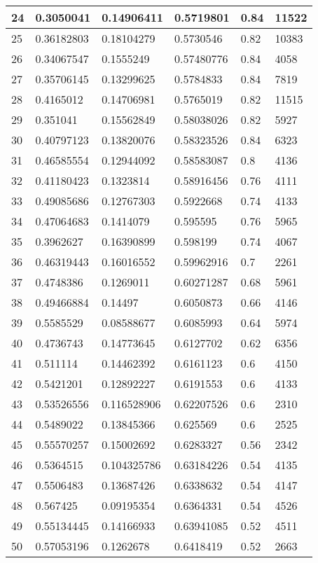 \begin{longtable}{|l|l|l|l|l|l|}
24 & 0.3050041 & 0.14906411 & 0.5719801 & 0.84 & 11522 \\ \hline 
25 & 0.36182803 & 0.18104279 & 0.5730546 & 0.82 & 10383 \\ \hline 
26 & 0.34067547 & 0.1555249 & 0.57480776 & 0.84 & 4058 \\ \hline 
27 & 0.35706145 & 0.13299625 & 0.5784833 & 0.84 & 7819 \\ \hline 
28 & 0.4165012 & 0.14706981 & 0.5765019 & 0.82 & 11515 \\ \hline 
29 & 0.351041 & 0.15562849 & 0.58038026 & 0.82 & 5927 \\ \hline 
30 & 0.40797123 & 0.13820076 & 0.58323526 & 0.84 & 6323 \\ \hline 
31 & 0.46585554 & 0.12944092 & 0.58583087 & 0.8 & 4136 \\ \hline 
32 & 0.41180423 & 0.1323814 & 0.58916456 & 0.76 & 4111 \\ \hline 
33 & 0.49085686 & 0.12767303 & 0.5922668 & 0.74 & 4133 \\ \hline 
34 & 0.47064683 & 0.1414079 & 0.595595 & 0.76 & 5965 \\ \hline 
35 & 0.3962627 & 0.16390899 & 0.598199 & 0.74 & 4067 \\ \hline 
36 & 0.46319443 & 0.16016552 & 0.59962916 & 0.7 & 2261 \\ \hline 
37 & 0.4748386 & 0.1269011 & 0.60271287 & 0.68 & 5961 \\ \hline 
38 & 0.49466884 & 0.14497 & 0.6050873 & 0.66 & 4146 \\ \hline 
39 & 0.5585529 & 0.08588677 & 0.6085993 & 0.64 & 5974 \\ \hline 
40 & 0.4736743 & 0.14773645 & 0.6127702 & 0.62 & 6356 \\ \hline 
41 & 0.511114 & 0.14462392 & 0.6161123 & 0.6 & 4150 \\ \hline 
42 & 0.5421201 & 0.12892227 & 0.6191553 & 0.6 & 4133 \\ \hline 
43 & 0.53526556 & 0.116528906 & 0.62207526 & 0.6 & 2310 \\ \hline 
44 & 0.5489022 & 0.13845366 & 0.625569 & 0.6 & 2525 \\ \hline 
45 & 0.55570257 & 0.15002692 & 0.6283327 & 0.56 & 2342 \\ \hline 
46 & 0.5364515 & 0.104325786 & 0.63184226 & 0.54 & 4135 \\ \hline 
47 & 0.5506483 & 0.13687426 & 0.6338632 & 0.54 & 4147 \\ \hline 
48 & 0.567425 & 0.09195354 & 0.6364331 & 0.54 & 4526 \\ \hline 
49 & 0.55134445 & 0.14166933 & 0.63941085 & 0.52 & 4511 \\ \hline 
50 & 0.57053196 & 0.1262678 & 0.6418419 & 0.52 & 2663 \\ \hline 
\end{longtable}